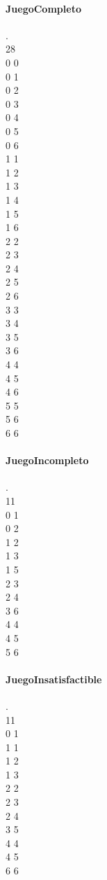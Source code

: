 \documentclass[es]{ifirak}
\begin{document}
\paragraph{JuegoCompleto}.\\
28\\
0 0\\
0 1\\
0 2\\
0 3\\
0 4\\
0 5\\
0 6\\
1 1 \\
1 2\\
1 3\\
1 4\\
1 5\\
1 6\\
2 2\\
2 3\\
2 4\\
2 5\\
2 6\\
3 3\\
3 4\\
3 5\\
3 6\\
4 4\\
4 5\\
4 6\\
5 5\\
5 6\\
6 6\\

\pagebreak
\paragraph{JuegoIncompleto}.\\
11\\
0 1\\
0 2\\
1 2\\
1 3\\
1 5\\
2 3\\
2 4\\
3 6\\
4 4\\
4 5\\
5 6\\

\paragraph{JuegoInsatisfactible}.\\
11\\
0 1\\
1 1 \\
1 2\\
1 3\\
2 2\\
2 3\\
2 4\\
3 5\\
4 4\\
4 5\\
6 6\\
\end{document}
